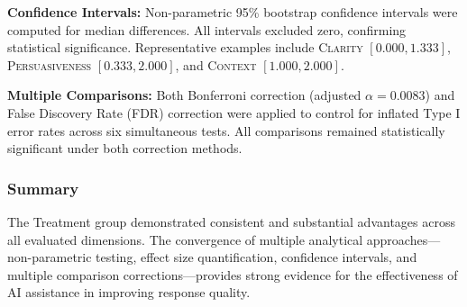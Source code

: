 \textbf{Confidence Intervals:} Non-parametric 95\% bootstrap confidence intervals were computed for median differences. All intervals excluded zero, confirming statistical significance. Representative examples include \textsc{Clarity} $[0.000, 1.333]$, \textsc{Persuasiveness} $[0.333, 2.000]$, and \textsc{Context} $[1.000, 2.000]$.

\textbf{Multiple Comparisons:} Both Bonferroni correction (adjusted $\alpha = 0.0083$) and False Discovery Rate (FDR) correction were applied to control for inflated Type I error rates across six simultaneous tests. All comparisons remained statistically significant under both correction methods.

\subsubsection{Summary}

The Treatment group demonstrated consistent and substantial advantages across all evaluated dimensions. The convergence of multiple analytical approaches—non-parametric testing, effect size quantification, confidence intervals, and multiple comparison corrections—provides strong evidence for the effectiveness of AI assistance in improving response quality.

